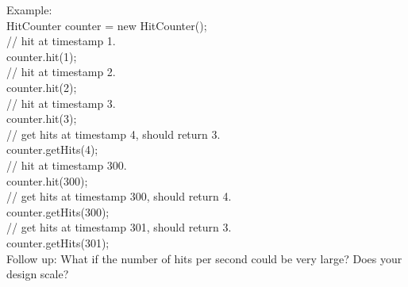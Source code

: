Example:\\
HitCounter counter = new HitCounter();\\

// hit at timestamp 1.\\
counter.hit(1);\\

// hit at timestamp 2.\\
counter.hit(2);\\

// hit at timestamp 3.\\
counter.hit(3);\\

// get hits at timestamp 4, should return 3.\\
counter.getHits(4);\\

// hit at timestamp 300.\\
counter.hit(300);\\

// get hits at timestamp 300, should return 4.\\
counter.getHits(300);\\

// get hits at timestamp 301, should return 3.\\
counter.getHits(301); \\

Follow up: What if the number of hits per second could be very large? Does your design scale? \\

